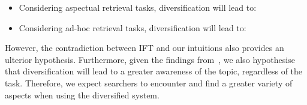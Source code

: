 \begin{itemize}
\item Considering aspectual retrieval tasks, diversification will lead to:

\vspace*{1.5mm}

\item Considering ad-hoc retrieval tasks, diversification will lead to:
\end{itemize}

However, the contradiction between IFT and our intuitions also provides an ulterior hypothesis. Furthermore, given the findings from~\cite{syed2017sal}, we also hypothesise that diversification will lead to a greater awareness of the topic, regardless of the task. Therefore, we expect searchers to encounter and find a greater variety of aspects when using the diversified system.






